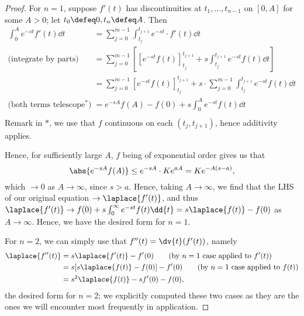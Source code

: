 \begin{proof}
    For $n = 1$, suppose $f'(t)$ has discontinuities at $t_1, \dots, t_{n - 1}$ on $[0, A]$ for some $A > 0$; let $t_0 \defeq 0, t_n \defeq A$. Then \begin{align*}
        \int_0^A e^{-st} f'(t) \dd{t} &= \sum_{j=0}^{m-1} \int_{t_j}^{t_{j+1}} e^{-st} \cdot f'(t) \dd{t}\\
        \text{(integrate by parts)}\qquad &= \sum_{j=0}^{m-1} \left[\left[e^{-st} f(t)\right]_{t_j}^{t_{j+1}} + s \int_{t_j}^{t_{j+1}} e^{-st} f(t) \dd{t}\right]\\
        &= \sum_{j=0}^{m-1}\left[e^{-st} f(t)\right]_{t_j}^{t_{j+1}} + s \cdot \sum_{j=0}^{m-1} \int_{t_j}^{t_{j+1}} e^{-st} f(t)\dd{t}\\
        \text{(both terms telescope$^\ast$)} \qquad &= e^{-sA} f(A) - f(0) + s \int_0^{A} e^{-st} f(t) \dd{t}\\
    \end{align*}
    Remark in $\ast$, we use that $f$ continuous on each $(t_{j}, t_{j+1})$, hence additivity applies.

    Hence, for sufficiently large $A$, $f$ being of exponential order gives us that $$\abs{e^{-sA} f(A)}\leq e^{-sA} \cdot K e^{aA} = Ke^{-A(s-a)},$$
    which $\to 0$ as $A \to \infty$, since $s > a$. Hence, taking $A \to \infty$, we find that the LHS of our original equation $\to \laplace{f'(t)}$, and thus $\laplace{f'(t)} \to f(0) + s \int_0^{\infty} e^{-st} f(t) \dd{t} = s \laplace{f(t)} - f(0)$ as $A \to \infty$. Hence, we have the desired form for $n = 1$.

    For $n = 2$, we can simply use that $f''(t) = \dv{t}(f'(t))$, namely \begin{align*}
        \laplace{f''(t)} &= s \laplace{f'(t)} - f'(0) \qquad \text{(by $n = 1$ case applied to $f'(t)$)}\\
        &= s [s \laplace{f(t)} - f(0)] - f'(0) \qquad \text{(by $n = 1$ case applied to $f(t)$)}\\
        &= s^2 \laplace{f(t)} - sf'(0) - f(0),
    \end{align*}
    the desired form for $n = 2$; we explicitly computed these two cases as they are the ones we will encounter most frequently in application.


\end{proof}
